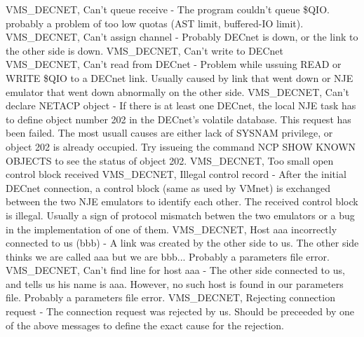 \hfill\break
{\ncrBold VMS\_DECNET,  Can't  queue  receive  }
-  The  program couldn't queue \$QIO.
probably a problem of too low quotas (AST limit, buffered-IO limit).
\hfill\break
{\ncrBold VMS\_DECNET, Can't assign channel }
- Probably DECnet is down, or the  link
to the other side is down.
\hfill\break
{\ncrBold VMS\_DECNET, Can't write to DECnet}
\hfill\break
{\ncrBold VMS\_DECNET, Can't read from DECnet}
- Problem while ussuing READ or WRITE
\$QIO to a DECnet link. Usually caused by link  that  went  down  or  NJE
emulator that went down abnormally on the other side.
\hfill\break
{\ncrBold VMS\_DECNET,  Can't  declare  NETACP  object}
-  If there is at least one
DECnet, the local NJE task has  to  define  object  number  202  in  the
DECnet's  volatile  database.  This  request  has  been failed. The most
usuall causes are either lack of SYSNAM  privilege,  or  object  202  is
already occupied. Try issueing the command NCP SHOW KNOWN OBJECTS to see
the status of object 202.
\hfill\break
{\ncrBold VMS\_DECNET, Too small open control block received}
\hfill\break
{\ncrBold VMS\_DECNET,  Illegal  control  record }
-  After   the   initial   DECnet
connection, a control block (same as used by VMnet) is exchanged between
the two NJE emulators to identify each other. The received control block
is illegal. Usually a sign of protocol mismatch betwen the two emulators
or a bug in the implementation of one of them.
\hfill\break
{\ncrBold VMS\_DECNET, Host aaa incorrectly connected to us  (bbb)}
-  A  link  was
created by the other side to us. The other side thinks we are called aaa
but we are bbb... Probably a parameters file error.
\hfill\break
{\ncrBold VMS\_DECNET, Can't find line for host aaa}
- The other side  connected  to
us,  and tells us his name is aaa. However, no such host is found in our
parameters file. Probably a parameters file error.
\hfill\break
{\ncrBold VMS\_DECNET, Rejecting connection request}
- The  connection  request  was
rejected  by  us.  Should  be  preceeded by one of the above messages to
define the exact cause for the rejection.

